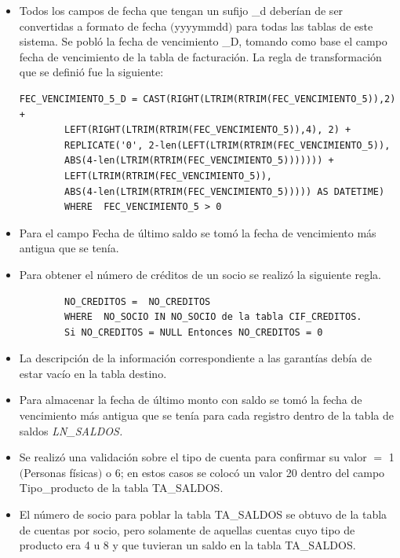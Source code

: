 \begin{itemize}

\item Todos los campos de fecha que tengan un sufijo \_d deberían de ser
  convertidas a formato de fecha $($yyyymmdd$)$ para todas las tablas de este
  sistema. Se pobló la fecha de vencimiento \_D, tomando como base el campo
  fecha de vencimiento de la tabla de facturación. La regla de transformación
  que se definió fue la siguiente:

\begin{verbatim}
FEC_VENCIMIENTO_5_D = CAST(RIGHT(LTRIM(RTRIM(FEC_VENCIMIENTO_5)),2) +
        LEFT(RIGHT(LTRIM(RTRIM(FEC_VENCIMIENTO_5)),4), 2) +
        REPLICATE('0', 2-len(LEFT(LTRIM(RTRIM(FEC_VENCIMIENTO_5)),
        ABS(4-len(LTRIM(RTRIM(FEC_VENCIMIENTO_5))))))) +
        LEFT(LTRIM(RTRIM(FEC_VENCIMIENTO_5)),
        ABS(4-len(LTRIM(RTRIM(FEC_VENCIMIENTO_5))))) AS DATETIME)
        WHERE  FEC_VENCIMIENTO_5 > 0
\end{verbatim}

\item Para el campo Fecha de último saldo se tomó la fecha de vencimiento más
  antigua que se tenía.
\item Para obtener el número de créditos de un socio se realizó la siguiente
  regla.

\begin{verbatim}
        NO_CREDITOS =  NO_CREDITOS
        WHERE  NO_SOCIO IN NO_SOCIO de la tabla CIF_CREDITOS.
        Si NO_CREDITOS = NULL Entonces NO_CREDITOS = 0
\end{verbatim}

\item La descripción de la información correspondiente a las garantías debía
  de estar vacío en la tabla destino.

\item Para almacenar la fecha de último monto con saldo se tomó la fecha de
  vencimiento más antigua que se tenía para cada registro dentro de la tabla de
  saldos \textit{LN\_SALDOS.}

\item Se realizó una validación sobre el tipo de cuenta para confirmar su
  valor $=$ 1 $($Personas físicas$)$ o 6; en estos casos se colocó un valor 20
  dentro del campo Tipo\_producto de la tabla TA\_SALDOS.

\item El número de socio para poblar la tabla TA\_SALDOS se obtuvo de la
  tabla de cuentas por socio, pero solamente de aquellas cuentas cuyo tipo de
  producto era 4 u 8 y que tuvieran un saldo en la tabla TA\_SALDOS.


\end{itemize}
